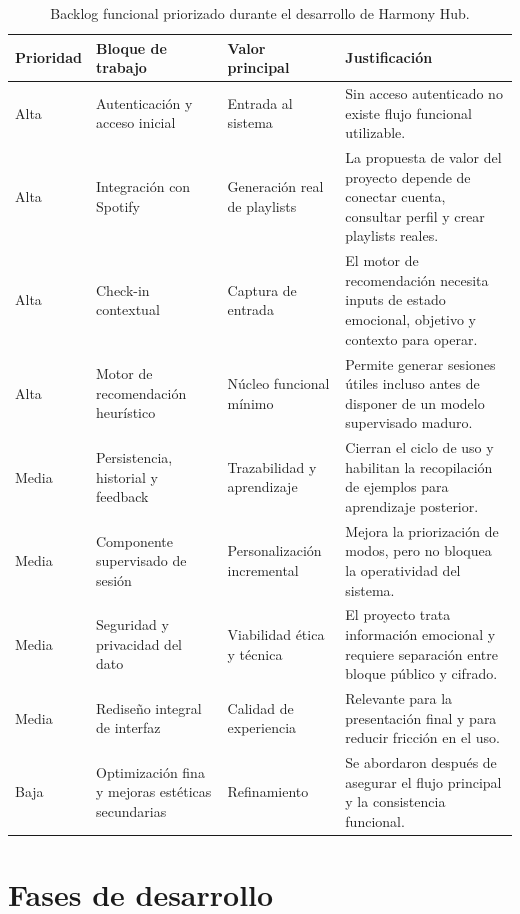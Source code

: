 \begin{table}[H]
\centering
\scriptsize
\renewcommand{\arraystretch}{1.1}
\setlength{\tabcolsep}{3pt}
\begin{tabularx}{\textwidth}{|P{1.45cm}|P{3.55cm}|P{2.45cm}|Y|}
\hline
\textbf{Prioridad} & \textbf{Bloque de trabajo} & \textbf{Valor principal} & \textbf{Justificación} \\
\hline
Alta & Autenticación y acceso inicial & Entrada al sistema & Sin acceso autenticado no existe flujo funcional utilizable. \\
\hline
Alta & Integración con Spotify & Generación real de playlists & La propuesta de valor del proyecto depende de conectar cuenta, consultar perfil y crear playlists reales. \\
\hline
Alta & Check-in contextual & Captura de entrada & El motor de recomendación necesita inputs de estado emocional, objetivo y contexto para operar. \\
\hline
Alta & Motor de recomendación heurístico & Núcleo funcional mínimo & Permite generar sesiones útiles incluso antes de disponer de un modelo supervisado maduro. \\
\hline
Media & Persistencia, historial y feedback & Trazabilidad y aprendizaje & Cierran el ciclo de uso y habilitan la recopilación de ejemplos para aprendizaje posterior. \\
\hline
Media & Componente supervisado de sesión & Personalización incremental & Mejora la priorización de modos, pero no bloquea la operatividad del sistema. \\
\hline
Media & Seguridad y privacidad del dato & Viabilidad ética y técnica & El proyecto trata información emocional y requiere separación entre bloque público y cifrado. \\
\hline
Media & Rediseño integral de interfaz & Calidad de experiencia & Relevante para la presentación final y para reducir fricción en el uso. \\
\hline
Baja & Optimización fina y mejoras estéticas secundarias & Refinamiento & Se abordaron después de asegurar el flujo principal y la consistencia funcional. \\
\hline
\end{tabularx}
\caption{Backlog funcional priorizado durante el desarrollo de Harmony Hub.}
\label{tab:backlog_priorizado}
\end{table}

\section{Fases de desarrollo}
\label{sec:fases_desarrollo}

